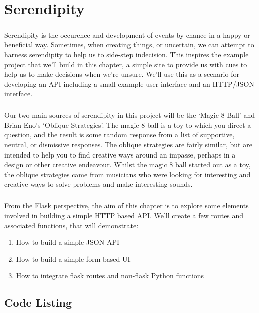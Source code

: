 \chapter{Serendipity}
\label{serendipity}
\paragraph{} Serendipity is the occurence and development of events by chance in a happy or beneficial way. Sometimes, when creating things, or uncertain, we can attempt to harness serendipity to help us to side-step indecision. This inspires the example project that we'll build in this chapter, a simple site to provide us with cues to help us to make decisions when we're unsure. We'll use this as a scenario for developing an API including a small example user interface and an HTTP/JSON interface.

\paragraph{} Our two main sources of serendipity in this project will be the `Magic 8 Ball' and Brian Eno's `Oblique Strategies'. The magic 8 ball is a toy to which you direct a question, and the result is some random response from a list of supportive, neutral, or dismissive responses.
The oblique strategies are fairly similar, but are intended to help you to find creative ways around an impasse, perhaps in a design or other creative endeavour. Whilst the magic 8 ball started out as a toy, the oblique strategies came from musicians who were looking for interesting and creative ways to solve problems and make interesting sounds.

\paragraph{} From the Flask perspective, the aim of this chapter is to explore some elements involved in building a simple HTTP based API. We'll create a few routes and associated functions, that will demonstrate:

\begin{enumerate}
\item How to build a simple JSON API
\item How to build a simple form-based UI
\item How to integrate flask routes and non-flask Python functions
\end{enumerate}


\section{Code Listing}

